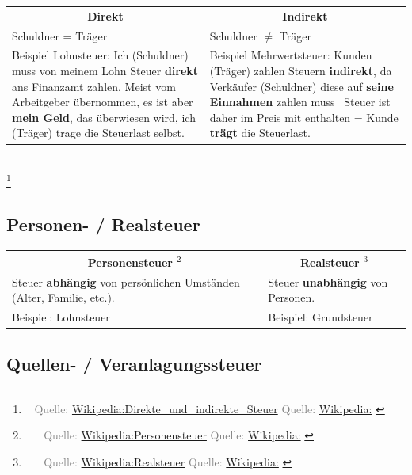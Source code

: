 \documentclass{beamer}
\let\oldfootnote\footnote
\renewcommand{\footnote}[1]
{%
	\oldfootnote
	{
		\tiny
		\textcolor{gray}{\ #1}
	}%
}
\newcommand{\citewiki}[2][]
{%
	\footnote
	{
		\ifthenelse{\isempty{#1}}
		{
			Quelle: \href{https://de.wikipedia.org/wiki/#2}{Wikipedia:#2}
		}
		{
			Quelle: \href{https://de.wikipedia.org/wiki/#2}{Wikipedia:#1}
		}
	}
}
\begin{document}
			\begin{frame}
				\begin{tabularx}{\linewidth}{X|X}
					\multicolumn{1}{c|}{\textbf{Direkt}} &
					\multicolumn{1}{c}{\textbf{Indirekt}} \\[0.25cm]
					Schuldner = Träger & Schuldner $\neq$ Träger \\
					\vspace{0.25cm}Beispiel Lohnsteuer: \newline
						Ich (Schuldner) muss von meinem Lohn Steuer \textbf{direkt} ans Finanzamt zahlen. Meist vom Arbeitgeber übernommen, es ist aber \textbf{mein Geld}, das überwiesen wird, ich (Träger) trage die Steuerlast selbst. & 
					\vspace{0.25cm}Beispiel Mehrwertsteuer: \newline
						Kunden (Träger) zahlen Steuern \textbf{indirekt}, da Verkäufer (Schuldner) diese auf \textbf{seine Einnahmen} zahlen muss \textrightarrow\ Steuer ist daher im Preis mit enthalten = Kunde \textbf{trägt} die Steuerlast.
				\end{tabularx}\\
				\citewiki{Direkte\_und\_indirekte\_Steuer}
			\end{frame}
		
		\subsection{Personen- / Realsteuer}
		
			\begin{frame}
				\begin{tabularx}{\linewidth}{X|X}
					\multicolumn{1}{c|}{\textbf{Personensteuer}\citewiki{Personensteuer}} &
					\multicolumn{1}{c}{\textbf{Realsteuer}\citewiki{Realsteuer}} \\[0.25cm]
					Steuer \textbf{abhängig} von persönlichen Umständen (Alter, Familie, etc.). & Steuer \textbf{unabhängig} von Personen. \\
					\vspace{0.25cm} Beispiel: Lohnsteuer &
					\vspace{0.25cm} Beispiel: Grundsteuer
				\end{tabularx}
			\end{frame}
		
		\subsection{Quellen- / Veranlagungssteuer}
		
\end{document}
